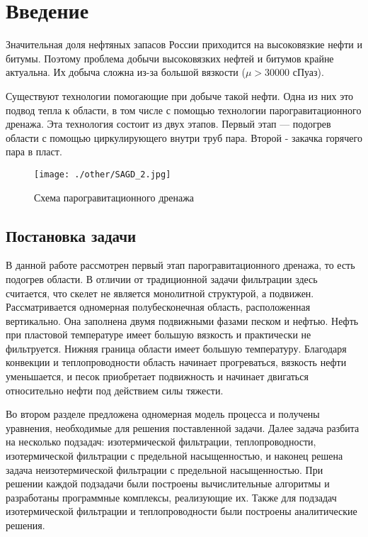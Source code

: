 \documentclass[12pt,a4paper]{article}
\begin{document}
\newpage
\tableofcontents
\newpage
\section{Введение}


Значительная доля нефтяных запасов России приходится на высоковязкие нефти и битумы. Поэтому проблема добычи высоковязких нефтей и битумов крайне актуальна. Их добыча сложна из-за большой вязкости ($\mu > 30000 $ сПуаз). 

Существуют технологии помогающие при добыче такой нефти. Одна из них это подвод тепла к области, в том числе с помощью технологии парогравитационного дренажа. Эта технология состоит из двух этапов. Первый этап — подогрев области с помощью циркулирующего внутри труб пара. Второй - закачка горячего пара в пласт.

\begin{figure}[h!]
\begin{center}
\texttt{[image: ./other/SAGD\_2.jpg]}
\caption{Схема парогравитационного дренажа}
\end{center}
\end{figure}

\subsection {Постановка задачи}

В данной работе рассмотрен первый этап парогравитационного дренажа, то есть подогрев области. В отличии от традиционной задачи фильтрации здесь считается, что скелет не является монолитной структурой, а подвижен. Рассматривается одномерная полубесконечная область, расположенная вертикально. Она заполнена двумя подвижными фазами песком и нефтью. Нефть при пластовой температуре имеет большую вязкость и практически не фильтруется. Нижняя граница области имеет большую температуру. Благодаря конвекции и теплопроводности область начинает прогреваться, вязкость нефти уменьшается, и песок приобретает подвижность и начинает двигаться относительно нефти под действием силы тяжести.

Во втором разделе предложена одномерная модель процесса  и получены уравнения, необходимые для решения поставленной задачи. Далее задача разбита на несколько подзадач: изотермической фильтрации, теплопроводности, изотермической фильтрации с предельной насыщенностью, и наконец решена задача неизотермической фильтрации с предельной насыщенностью. При решении каждой подзадачи были построены вычислительные алгоритмы и разработаны программные комплексы, реализующие их. Также для подзадач изотермической фильтрации и теплопроводности были построены аналитические решения.
\end{document}
